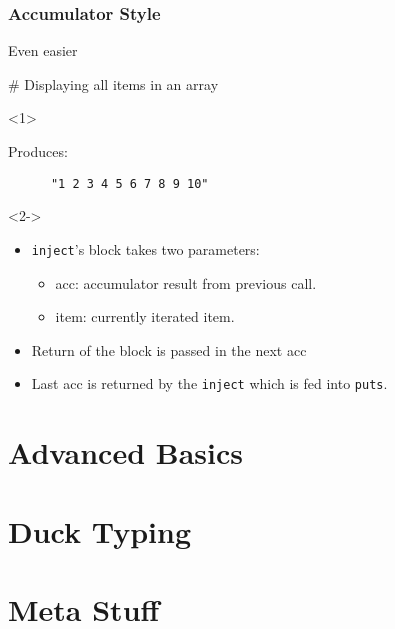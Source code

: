 \documentclass{beamer}
\begin{document}
\begin{frame}[t,fragile]
  \frametitle{Accumulator Style}
  \begin{block}{Even easier}
    \begin{semiverbatim}
      \# Displaying all items in an array
    \end{semiverbatim}
    \begin{onlyenv}<1>
      \begin{block}{Produces:}
	\begin{verbatim}
	  "1 2 3 4 5 6 7 8 9 10"
	\end{verbatim}
      \end{block}
    \end{onlyenv}
    \begin{onlyenv}<2->
      \begin{itemize}
        \item<2> \texttt{inject}'s block takes two parameters:
        \begin{itemize}
	  \item{acc}: accumulator result from previous call.
	  \item{item}: currently iterated item.
        \end{itemize}
        \item<3> Return of the block is passed in the next acc
        \item<4> Last acc is returned by the \texttt{inject} which is fed into \texttt{puts}.
      \end{itemize}
    \end{onlyenv}
    \end{block}
\end{frame}
  

\section{Advanced Basics}
\begin{frame}
\end{frame}

\section{Duck Typing}
\begin{frame}
\end{frame}

\section{Meta Stuff}
\begin{frame}
\end{frame}
\end{document}
